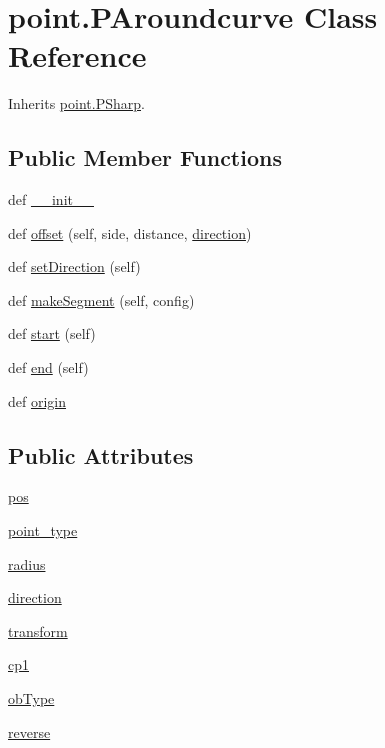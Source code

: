 \hypertarget{classpoint_1_1_p_aroundcurve}{}\section{point.\+P\+Aroundcurve Class Reference}
\label{classpoint_1_1_p_aroundcurve}


Inherits \hyperlink{classpoint_1_1_p_sharp}{point.\+P\+Sharp}.

\subsection*{Public Member Functions}
\begin{DoxyCompactItemize}
\item 
def \hyperlink{classpoint_1_1_p_aroundcurve_abf8a513ce57f9b1477a64cb68f29a229}{\+\_\+\+\_\+init\+\_\+\+\_\+}
\item 
def \hyperlink{classpoint_1_1_p_aroundcurve_aa62a97561ec9a6a39360db3bc4afb9b5}{offset} (self, side, distance, \hyperlink{classpoint_1_1_p_aroundcurve_a35548cdf3426f241a2f4dca3c4c07cf4}{direction})
\item 
def \hyperlink{classpoint_1_1_p_aroundcurve_ab3adc6be84047ee66a5cbbf4b6396b94}{set\+Direction} (self)
\item 
def \hyperlink{classpoint_1_1_p_aroundcurve_a63c9705a5fbdbde72b5bde450324178d}{make\+Segment} (self, config)
\item 
def \hyperlink{classpoint_1_1_p_aroundcurve_a9f9818c6d18639d55b79af5f1c0a46d6}{start} (self)
\item 
def \hyperlink{classpoint_1_1_p_aroundcurve_ad2db9dc27bd5b55354382b2cf9863303}{end} (self)
\item 
def \hyperlink{classpoint_1_1_p_aroundcurve_a73d952075b6e0a82897d597e5a5235e2}{origin}
\end{DoxyCompactItemize}
\subsection*{Public Attributes}
\begin{DoxyCompactItemize}
\item 
\hyperlink{classpoint_1_1_p_aroundcurve_aa991f6099845e2e54363ca607ec0f58e}{pos}
\item 
\hyperlink{classpoint_1_1_p_aroundcurve_ade9f5e6f5419e6aea11c020385a38f6a}{point\+\_\+type}
\item 
\hyperlink{classpoint_1_1_p_aroundcurve_a9b5f99d653825fb5395078f3595c03cc}{radius}
\item 
\hyperlink{classpoint_1_1_p_aroundcurve_a35548cdf3426f241a2f4dca3c4c07cf4}{direction}
\item 
\hyperlink{classpoint_1_1_p_aroundcurve_a1a8bd2e8bba44444912fb13e79f53c1a}{transform}
\item 
\hyperlink{classpoint_1_1_p_aroundcurve_a57f68703c7c964bb2b92dae3002fe7f5}{cp1}
\item 
\hyperlink{classpoint_1_1_p_aroundcurve_a8eb53f5eb3d2dda9c52f70c658a215b9}{ob\+Type}
\item 
\hyperlink{classpoint_1_1_p_aroundcurve_a3241c3671e0fa3d11b165e8ca2801997}{reverse}
\end{DoxyCompactItemize}
